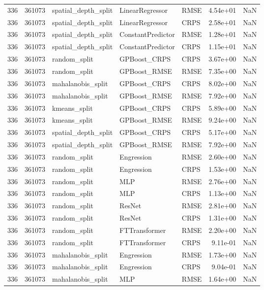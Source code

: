 \begin{tabular}{rrlllrr}
336 & 361073 & spatial\_depth\_split & LinearRegressor & RMSE & 4.54e+01 & NaN \\
336 & 361073 & spatial\_depth\_split & LinearRegressor & CRPS & 2.58e+01 & NaN \\
336 & 361073 & spatial\_depth\_split & ConstantPredictor & RMSE & 1.28e+01 & NaN \\
336 & 361073 & spatial\_depth\_split & ConstantPredictor & CRPS & 1.15e+01 & NaN \\
336 & 361073 & random\_split & GPBoost\_CRPS & CRPS & 3.67e+00 & NaN \\
336 & 361073 & random\_split & GPBoost\_RMSE & RMSE & 7.35e+00 & NaN \\
336 & 361073 & mahalanobis\_split & GPBoost\_CRPS & CRPS & 8.02e+00 & NaN \\
336 & 361073 & mahalanobis\_split & GPBoost\_RMSE & RMSE & 7.92e+00 & NaN \\
336 & 361073 & kmeans\_split & GPBoost\_CRPS & CRPS & 5.89e+00 & NaN \\
336 & 361073 & kmeans\_split & GPBoost\_RMSE & RMSE & 9.24e+00 & NaN \\
336 & 361073 & spatial\_depth\_split & GPBoost\_CRPS & CRPS & 5.17e+00 & NaN \\
336 & 361073 & spatial\_depth\_split & GPBoost\_RMSE & RMSE & 7.92e+00 & NaN \\
336 & 361073 & random\_split & Engression & RMSE & 2.60e+00 & NaN \\
336 & 361073 & random\_split & Engression & CRPS & 1.53e+00 & NaN \\
336 & 361073 & random\_split & MLP & RMSE & 2.76e+00 & NaN \\
336 & 361073 & random\_split & MLP & CRPS & 1.13e+00 & NaN \\
336 & 361073 & random\_split & ResNet & RMSE & 2.81e+00 & NaN \\
336 & 361073 & random\_split & ResNet & CRPS & 1.31e+00 & NaN \\
336 & 361073 & random\_split & FTTransformer & RMSE & 2.20e+00 & NaN \\
336 & 361073 & random\_split & FTTransformer & CRPS & 9.11e-01 & NaN \\
336 & 361073 & mahalanobis\_split & Engression & RMSE & 1.73e+00 & NaN \\
336 & 361073 & mahalanobis\_split & Engression & CRPS & 9.04e-01 & NaN \\
336 & 361073 & mahalanobis\_split & MLP & RMSE & 1.64e+00 & NaN \\

\end{tabular}
